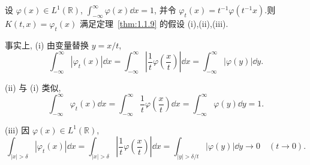 \begin{example}\label{exa:1.1.10}
设 $\varphi(x) \in L^{1}(\mathbb{R})$, $\int_{-\infty}^{\infty} \varphi(x)\dd x = 1$, 并令 $\varphi_{t}(x) = t^{-1}\varphi(t^{-1}x)$.则 $K(t,x) = \varphi_{t}(x)$ 满足定理~\ref{thm:1.1.9} 的假设 (i),(ii),(iii).

事实上, (i) 由变量替换 $y = x/t$, 
\begin{equation*}
\int_{-\infty}^{\infty} |\varphi_{t}(x)|\dd x = \int_{-\infty}^{\infty}\left| \frac{1}{t}\varphi\left(\frac{x}{t}\right) \right|\dd x = \int_{-\infty}^{\infty} |\varphi(y)|\dd y.
\end{equation*}

(ii) 与 (i) 类似, 
\begin{equation*}
\int_{-\infty}^{\infty} \varphi_{t}(x)\dd x = \int_{-\infty}^{\infty} \frac{1}{t}\varphi\left(\frac{x}{t}\right)\dd x = \int_{-\infty}^{\infty} \varphi(y)\dd y = 1.
\end{equation*}

(iii) 因 $\varphi(x) \in L^{1}(\mathbb{R})$, 
\begin{equation*}
\int_{|x| > \delta} |\varphi_{t}(x)|\dd x = \int_{|x| > \delta}\left| \frac{1}{t}\varphi\left(\frac{x}{t}\right)\right|\dd x = \int_{|y| > \delta/t} |\varphi(y)|\dd y \rightarrow 0 \quad (t \rightarrow 0).
\end{equation*}
\end{example}
